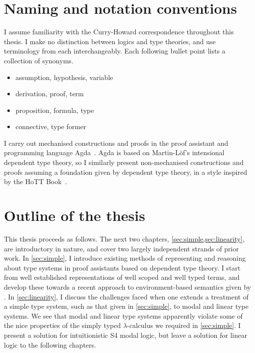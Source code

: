 \section{Naming and notation conventions}

I assume familiarity with the Curry-Howard correspondence throughout this
thesis.
I make no distinction between logics and type theories, and use terminology from
each interchangeably.
Each following bullet point lists a collection of synonyms.

\begin{itemize}
  \item assumption, hypothesis, variable
  \item derivation, proof, term
  \item proposition, formula, type
  \item connective, type former
\end{itemize}

I carry out mechanised constructions and proofs in the proof assistant and
programming language Agda~\citep{Agda}.
Agda is based on Martin-L\"{o}f's intensional dependent type theory, so I
similarly present non-mechanised constructions and proofs assuming a foundation
given by dependent type theory, in a style inspired by the HoTT
Book~\citep{hottbook}.

\section{Outline of the thesis}

This thesis proceeds as follows.
The next two chapters, \cref{sec:simple,sec:linearity}, are introductory in
nature, and cover two largely independent strands of prior work.
In \cref{sec:simple}, I introduce existing methods of representing and reasoning
about type systems in proof assistants based on dependent type theory.
I start from well established representations of well scoped and well typed
terms, and develop these towards a recent approach to environment-based
semantics given by \citet{AACMM21}.
In \cref{sec:linearity}, I discuss the challenges faced when one extends a
treatment of a simple type system, such as that given in \cref{sec:simple}, to
modal and linear type systems.
We see that modal and linear type systems apparently violate some of the nice
properties of the simply typed $\lambda$-calculus we required in
\cref{sec:simple}.
I present a solution for intuitionistic S4 modal logic, but leave a solution for
linear logic to the following chapters.

